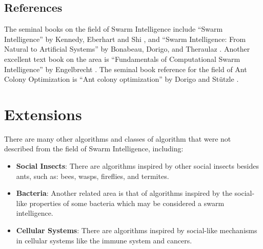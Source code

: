 \begin{bibunit}
\subsection{References}
The seminal books on the field of Swarm Intelligence include ``Swarm Intelligence'' by Kennedy, Eberhart and Shi \cite{Kennedy2001}, and ``Swarm Intelligence: From Natural to Artificial Systems'' by Bonabeau, Dorigo, and Theraulaz \cite{Bonabeau1999}. Another excellent text book on the area is ``Fundamentals of Computational Swarm Intelligence'' by Engelbrecht \cite{Engelbrecht2006}. The seminal book reference for the field of Ant Colony Optimization is ``Ant colony optimization'' by Dorigo and St\"utzle \cite{Dorigo2004}.

\section{Extensions}
There are many other algorithms and classes of algorithm that were not described from the field of Swarm Intelligence, including:

\begin{itemize}
	\item \textbf{Social Insects}: There are algorithms inspired by other social insects besides ants, such as: bees, wasps, fireflies, and termites.
	\item \textbf{Bacteria}: Another related area is that of algorithms inspired by the social-like properties of some bacteria which may be considered a swarm intelligence.
	\item \textbf{Cellular Systems}: There are algorithms inspired by social-like mechanisms in cellular systems like the immune system and cancers.
\end{itemize}

\putbib
\end{bibunit}


\newpage\begin{bibunit}\putbib\end{bibunit}
\newpage\begin{bibunit}\putbib\end{bibunit}
\newpage\begin{bibunit}\putbib\end{bibunit}
\newpage\begin{bibunit}\putbib\end{bibunit}
\newpage\begin{bibunit}\putbib\end{bibunit}
